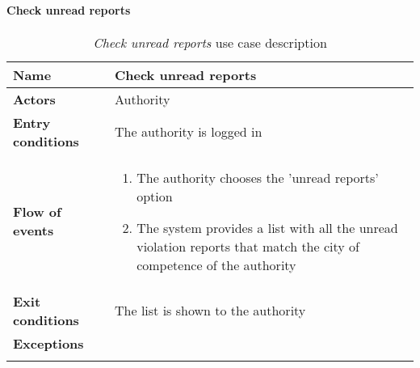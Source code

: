 		\paragraph{Check unread reports}
		\begin{longtable}{p{0.25\linewidth}p{0.75\linewidth}}
			\toprule
			\textbf{Name} & \textbf{Check unread reports} \\
			\midrule
			\textbf{Actors} & Authority\\
			\midrule
			\textbf{Entry conditions} & The authority is logged in \\
			\midrule
			\textbf{Flow of events} & 
			\begin{enumerate}
				\item The authority chooses the 'unread reports' option
				\item The system provides a list with all the unread violation reports that match the city of competence of the authority
			\end{enumerate} \\
			\midrule
			\textbf{Exit conditions} & The list is shown to the authority\\
			\midrule
			\textbf{Exceptions} &  \\
			\bottomrule
			\caption{\emph{Check unread reports} use case description}
		\end{longtable}
	
